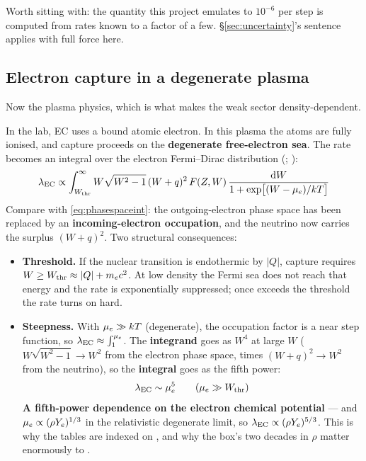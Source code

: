 \begin{warn}
Worth sitting with: the quantity this project emulates to $10^{-6}$ per step is
computed from rates known to a factor of a few. \S\ref{sec:uncertainty}'s
sentence applies with full force here.
\end{warn}

\subsection{Electron capture in a degenerate plasma}
\label{sec:ec-degenerate}

Now the plasma physics, which is what makes the weak sector density-dependent.

In the lab, EC uses a bound atomic electron. In this plasma the atoms are fully
ionised, and capture proceeds on the \textbf{degenerate free-electron sea}. The
rate becomes an integral over the electron Fermi--Dirac distribution
(\citealp{langanke2000}; \citealp[eq.~3]{bildsten1998}):
%
\begin{equation}
\lambda_{\rm EC} \propto \int_{W_{\rm thr}}^{\infty}
W\sqrt{W^2-1}\,(W+q)^2\,F(Z,W)\,
\frac{\mathrm{d} W}{1+\exp\bigl[(W-\mu_{e})/kT\bigr]}
\label{eq:ecintegral}
\end{equation}
%
Compare with \eqref{eq:phasespaceint}: the outgoing-electron phase space has
been replaced by an \textbf{incoming-electron occupation}, and the neutrino now
carries the surplus $(W + q)^2$. Two structural consequences:

\begin{itemize}
\item \textbf{Threshold.} If the nuclear transition is endothermic by $|Q|$,
      capture requires $W \ge W_{\rm thr} \approx |Q| + m_ec^2$. At low density
      the Fermi sea does not reach that energy and the rate is exponentially
      suppressed; once \muE{} exceeds the threshold the rate turns on hard.
\item \textbf{Steepness.} With $\mu_{e} \gg kT$ (degenerate), the occupation factor
      is a near step function, so
      $\lambda_{\rm EC} \approx \int_1^{\mu_{e}}$. The \textbf{integrand} goes as
      $W^4$ at large $W$ ($W\sqrt{W^2-1} \to W^2$ from the electron phase space,
      times $(W+q)^2 \to W^2$ from the neutrino), so the \textbf{integral} goes
      as the fifth power:
      \begin{equation*}
      \lambda_{\rm EC} \sim \mu_{e}^5 \qquad (\mu_{e} \gg W_{\rm thr})
      \end{equation*}
      \textbf{A fifth-power dependence on the electron chemical potential} ---
      and $\mu_{e} \propto (\rho Y_{e})^{1/3}$ in the relativistic degenerate limit, so
      $\lambda_{\rm EC} \propto (\rho Y_{e})^{5/3}$. This is why the tables are
      indexed on \rhoye, and why the box's two decades in $\rho$ matter
      enormously to \Ye.
\end{itemize}

